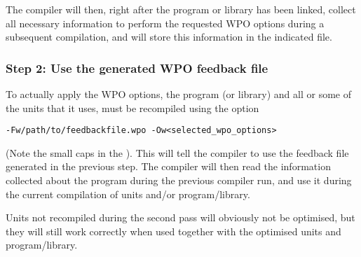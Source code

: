 The compiler will then, right after the program or library has been linked, 
collect all necessary information to perform the requested WPO options during 
a subsequent compilation, and will store this information in the indicated
file.

\subsubsection{Step 2: Use the generated WPO feedback file}
To actually apply the WPO options, the program (or library) and all or some 
of the units that it uses, must be recompiled using the option
\begin{verbatim}
-Fw/path/to/feedbackfile.wpo -Ow<selected_wpo_options>
\end{verbatim}
(Note the small caps in the ). This will tell the compiler to use 
the feedback file generated in the previous step. The compiler will then 
read the information collected about the program during the previous compiler 
run, and use it during the current compilation of units and/or program/library. 

Units not recompiled during the second pass will obviously not be optimised,
but they will still work correctly when used together with the optimised
units and program/library.


